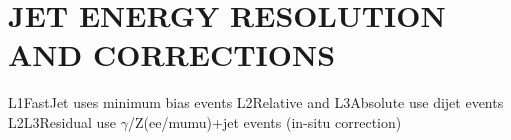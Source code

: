 %
%
%
%



\chapter{\texorpdfstring{\uppercase{Jet Energy Resolution and Corrections}}{Jet Energy Resolution and Corrections}}
\label{appendix:JERC}

L1FastJet uses minimum bias events
L2Relative and L3Absolute use dijet events
L2L3Residual use $\gamma$/Z(ee/mumu)+jet events (in-situ correction)